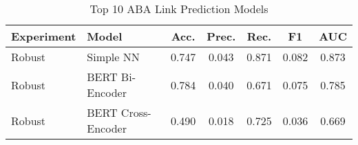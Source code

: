 \begin{table}[h]
\centering
\caption{Top 10 ABA Link Prediction Models}
\label{tab:aba_results}
\begin{tabular}{llccccc}
\hline
Experiment & Model & Acc. & Prec. & Rec. & F1 & AUC \\
\hline
Robust & Simple NN & 0.747 & 0.043 & 0.871 & 0.082 & 0.873 \\
Robust & BERT Bi-Encoder & 0.784 & 0.040 & 0.671 & 0.075 & 0.785 \\
Robust & BERT Cross-Encoder & 0.490 & 0.018 & 0.725 & 0.036 & 0.669 \\
\hline
\end{tabular}
\end{table}